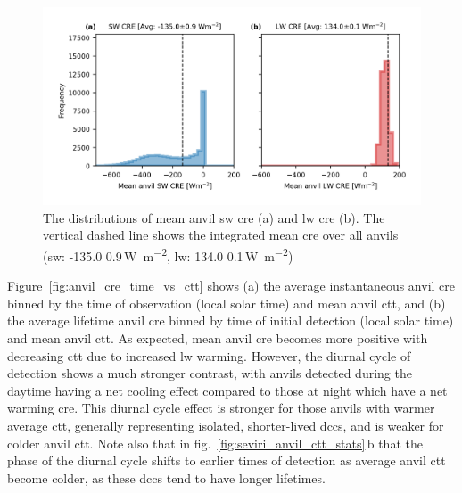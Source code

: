 \begin{figure}[tp]
    \includegraphics[width=\textwidth]{figures/chapter4_15.png}
    \caption[
    The distributions of mean anvil \acrshort{sw} \acrshort{cre} and \acrshort{lw} \acrshort{cre}
    ]{
    The distributions of mean anvil \acrshort{sw} \acrshort{cre} (a) and \acrshort{lw} \acrshort{cre} (b). The vertical dashed line shows the integrated mean \acrshort{cre} over all anvils (\acrshort{sw}: -135.0\,\textpm\,0.9\,\unit{W m^{-2}}, \acrshort{lw}: 134.0\,\textpm\,0.1\,\unit{W m^{-2}})
    }
    \label{fig:anvil_sw_lw_cre}
\end{figure}


Figure~\ref{fig:anvil_cre_time_vs_ctt} shows (a) the average instantaneous anvil \acrshort{cre} binned by the time of observation (local solar time) and mean anvil \acrshort{ctt}, and (b) the average lifetime anvil \acrshort{cre} binned by time of initial detection (local solar time) and mean anvil \acrshort{ctt}.
As expected, mean anvil \acrshort{cre} becomes more positive with decreasing \acrshort{ctt} due to increased \acrshort{lw} warming. 
However, the diurnal cycle of detection shows a much stronger contrast, with anvils detected during the daytime having a net cooling effect compared to those at night which have a net warming \acrshort{cre}. 
This diurnal cycle effect is stronger for those anvils with warmer average \acrshort{ctt}, generally representing isolated, shorter-lived \acrshort{dcc}s, and is weaker for colder anvil \acrshort{ctt}. 
Note also that in fig.~\ref{fig:seviri_anvil_ctt_stats}\,b that the phase of the diurnal cycle shifts to earlier times of detection as average anvil \acrshort{ctt} become colder, as these \acrshort{dcc}s tend to have longer lifetimes.


